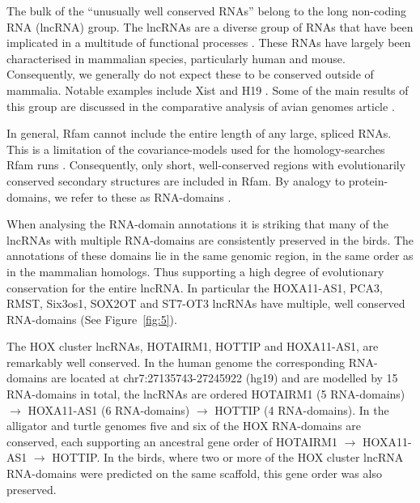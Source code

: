 \documentclass[10pt]{bmc_article}
\newenvironment{bmcformat}{\begin{raggedright}\baselineskip20pt\sloppy\setboolean{publ}{false}}{\end{raggedright}\baselineskip20pt\sloppy}
\begin{document}
\begin{bmcformat}
The bulk of the ``unusually well conserved RNAs'' belong to the long
non-coding RNA (lncRNA) group.  The lncRNAs are a diverse group of
RNAs that have been implicated in a multitude of functional processes
\cite{Rinn:2007,Chow:2005,Guttman:2009}. These RNAs have largely been
characterised in mammalian species, particularly human and
mouse. Consequently, we generally do not expect these to be conserved
outside of mammalia. Notable examples include Xist \cite{Duret:2006}
and H19 \cite{Smits:2008}. Some of the main results of this group are
discussed in the comparative analysis of avian genomes article \cite{}. 

In general, Rfam cannot include the entire length of any large, spliced
RNAs. This is a limitation of the covariance-models used for the
homology-searches Rfam runs \cite{Nawrocki:2009}. Consequently, only
short, well-conserved regions with evolutionarily conserved secondary
structures are included in Rfam. By analogy to protein-domains, we
refer to these as RNA-domains \cite{Burge:2013}.

When analysing the RNA-domain annotations it is striking that many of
the lncRNAs with multiple RNA-domains are consistently preserved in
the birds. The annotations of these domains lie in the same genomic
region, in the same order as in the mammalian homologs. Thus
supporting a high degree of evolutionary conservation for the entire
lncRNA. In particular the HOXA11-AS1, PCA3, RMST, Six3os1, SOX2OT and
ST7-OT3 lncRNAs have multiple, well conserved RNA-domains (See
Figure~\ref{fig:5}).

The HOX cluster lncRNAs, HOTAIRM1, HOTTIP and HOXA11-AS1, are
remarkably well conserved. In the human genome the corresponding
RNA-domains are located at chr7:27135743-27245922 (hg19) and are
modelled by 15 RNA-domains in total, the 
lncRNAs are ordered HOTAIRM1 (5 RNA-domains) $\rightarrow$ HOXA11-AS1
(6 RNA-domains) $\rightarrow$ HOTTIP (4 RNA-domains). In the alligator
and turtle genomes five and six of the HOX RNA-domains are conserved,
each supporting an ancestral gene order of HOTAIRM1 $\rightarrow$
HOXA11-AS1 $\rightarrow$ HOTTIP. In the birds, where two or more of
the HOX cluster lncRNA RNA-domains were predicted on the same
scaffold, this gene order was also preserved.


\end{bmcformat}
\end{document}
